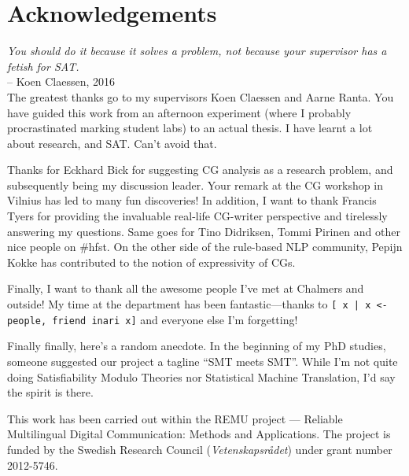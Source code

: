\chapter*{Acknowledgements}\label{chp:acknowledgements}


\emph{You should do it because it solves a problem, not because your supervisor has a fetish for SAT.} \\
-- Koen Claessen, 2016 \\


The greatest thanks go to my supervisors Koen Claessen and Aarne Ranta. 
You have guided this work from an afternoon experiment (where I probably procrastinated marking student labs) to an actual thesis. I have learnt a lot about research,  and SAT. Can't avoid that.


Thanks for Eckhard Bick for suggesting CG analysis as a research
problem, and subsequently being my discussion leader. 
Your remark at the CG workshop in Vilnius has led to many fun discoveries!
In addition, I want to thank Francis Tyers for providing the invaluable real-life CG-writer perspective and tirelessly answering my questions. Same goes for Tino Didriksen, Tommi Pirinen and other nice people on \#hfst. On the other side of the rule-based NLP community, Pepijn Kokke has contributed to the notion of expressivity of CGs.

Finally, I want to thank all the awesome people I've met at Chalmers and outside! 
My time at the department has been fantastic---thanks to 
\texttt{[ x | x <- people, friend inari x]}  and everyone else I'm forgetting! 









Finally finally, here's a random anecdote. 
In the beginning of my PhD studies, someone suggested our project 
a tagline ``SMT meets SMT''. While I'm not quite doing Satisfiability
Modulo Theories nor Statistical Machine Translation, I'd say the spirit is there.






\vfill\noindent
This work has been carried out within the REMU project — Reliable Multilingual Digital Communication: Methods and Applications.
The project is funded by the Swedish Research Council (\emph{Vetenskapsrådet}) under grant number 2012-5746.
